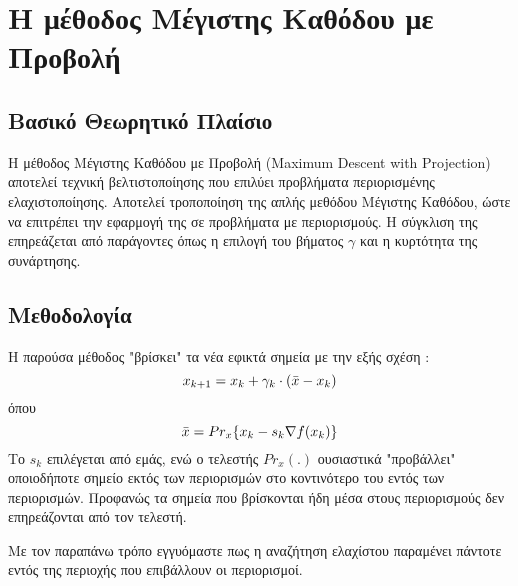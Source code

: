 \chapter{Η μέθοδος Μέγιστης Καθόδου με Προβολή}

\section{Βασικό Θεωρητικό Πλαίσιο}
Η μέθοδος Μέγιστης Καθόδου με Προβολή (Maximum Descent with Projection) αποτελεί τεχνική βελτιστοποίησης που επιλύει προβλήματα περιορισμένης ελαχιστοποίησης. Αποτελεί τροποποίηση της απλής μεθόδου Μέγιστης Καθόδου, ώστε να επιτρέπει την εφαρμογή της σε προβλήματα με περιορισμούς. Η σύγκλιση της επηρεάζεται από παράγοντες όπως η επιλογή του βήματος $\gamma$ και η κυρτότητα της συνάρτησης.

\section{Μεθοδολογία}
Η παρούσα μέθοδος "βρίσκει" τα νέα εφικτά σημεία με την εξής σχέση \cite{texnbelt}:
\begin{equation}
    x_{k+1} = x_k + \gamma_k \cdot (\Bar{x} - x_k)    
\end{equation}
όπου
\begin{equation}
    \Bar{x} = Pr_x\{x_k- s_k\nabla f(x_k)\}    
\end{equation}
Το $s_k$ επιλέγεται από εμάς, ενώ ο τελεστής $Pr_x(.)$ ουσιαστικά "προβάλλει" οποιοδήποτε σημείο εκτός των περιορισμών στο κοντινότερο του εντός των περιορισμών. Προφανώς τα σημεία που βρίσκονται ήδη μέσα στους περιορισμούς δεν επηρεάζονται από τον τελεστή.\par

Με τον παραπάνω τρόπο εγγυόμαστε πως η αναζήτηση ελαχίστου παραμένει πάντοτε εντός της περιοχής που επιβάλλουν οι περιορισμοί.